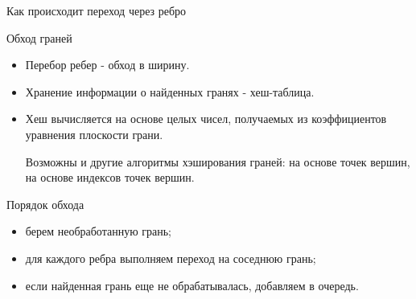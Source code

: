 \documentclass{beamer}
\begin{document}
\begin{frame}{Как происходит переход через ребро }
    \only<1>{}%
    \only<2>{}%
    \only<3>{}%
    \only<4>{}%
\end{frame}
\begin{frame}{Обход граней}
    \begin{itemize}
        \item Перебор ребер - обход в ширину.
        \item Хранение информации о найденных гранях - хеш-таблица.
        \item Хеш вычисляется на основе целых чисел, получаемых из коэффициентов уравнения плоскости грани.

        Возможны и другие алгоритмы хэширования граней: на основе точек вершин, на основе индексов точек вершин.
    \end{itemize}
    \vfill
    Порядок обхода
    \begin{itemize}
        \item берем необработанную грань;
        \item для каждого ребра выполняем переход на соседнюю грань;
        \item если найденная грань еще не обрабатывалась, добавляем в очередь.
    \end{itemize}
\end{frame}
\end{document}
